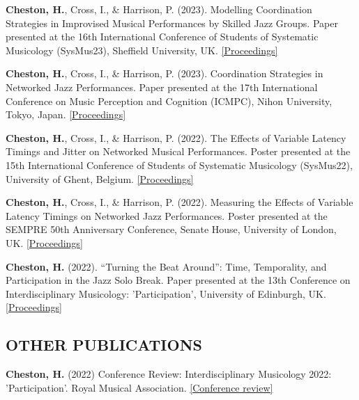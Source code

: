 \documentclass[11pt]{stylesheet} %
\begin{document}
\begin{resume}
\begin{hangparas}{.25in}{1}
\textbf{Cheston, H.}, Cross, I., \& Harrison, P. (2023). Modelling Coordination Strategies in Improvised Musical Performances by Skilled Jazz Groups. Paper presented at the 16th International Conference of Students of Systematic Musicology (SysMus23), Sheffield University, UK. \href{https://drive.google.com/file/d/14F5Xe8qfxfWpMW6pGuIl8fcaIYbmFDtt/view}{[Proceedings]}

\textbf{Cheston, H.}, Cross, I., \& Harrison, P. (2023). Coordination Strategies in Networked Jazz Performances. Paper presented at the 17th International Conference on Music Perception and Cognition (ICMPC), Nihon University, Tokyo, Japan. \href{https://icmpc17.com/proceedings-in-zip/ICMPC17-APSCOM7-e-Proceedings.zip/}{[Proceedings]}

\textbf{Cheston, H.}, Cross, I., \& Harrison, P. (2022). The Effects of Variable Latency Timings and Jitter on Networked Musical Performances. Poster presented at the 15th International Conference of Students of Systematic Musicology (SysMus22), University of Ghent, Belgium. \href{http://hdl.handle.net/1854/LU-01GVD6WBCVPGRAHMNYR1CEXF57}{[Proceedings]}

\textbf{Cheston, H.}, Cross, I., \& Harrison, P. (2022). Measuring the Effects of Variable Latency Timings on Networked Jazz Performances. Poster presented at the SEMPRE 50th Anniversary Conference, Senate House, University of London, UK. \href{https://drive.google.com/file/d/1P72Orm1gqSI4_gOah3Ueb9fdCpriVY_M/view}{[Proceedings]}

\textbf{Cheston, H.} (2022). “Turning the Beat Around”: Time, Temporality, and Participation in the Jazz Solo Break. Paper presented at the 13th Conference on Interdisciplinary Musicology: 'Participation', University of Edinburgh, UK. \href{http://journals.ed.ac.uk/CIM22-Proceedings}{[Proceedings]}
\end{hangparas}

\subsection{OTHER PUBLICATIONS}\vspace{-8pt}
\begin{hangparas}{.25in}{1}
\textbf{Cheston, H.} (2022) Conference Review: Interdisciplinary Musicology 2022: 'Participation'. Royal Musical Association. \href{https://www.rma.ac.uk/2022/06/23/conference-review-interdisciplinary-musicology-2022-participation/}{[Conference review]}
\end{hangparas}



\end{resume}
\end{document}
